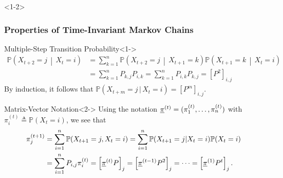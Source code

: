 \documentclass[10pt,english,aspectratio=169]{beamer}
\renewcommand{\Pr}{\mathbb{P}}
\begin{document}
\begin{frame}<1-2> \frametitle{Properties of Time-Invariant Markov Chains}

\vspace{-1.5mm}

\begin{exampleblock}{Multiple-Step Transition Probability}<1->
\vspace{-4mm}
\begin{align*}
\Pr\left(X_{t+2}=j\,\middle|\,X_{t}=i\right) & =\sum_{k=1}^{n}\Pr\left(X_{t+2}=j\,\middle|\,X_{t+1}=k\right)\Pr\left(X_{t+1}=k\,\middle|\,X_{t}=i\right)\\
 & =\sum_{k=1}^{n}P_{k,j}P_{i,k}=\sum_{k=1}^{n}P_{i,k}P_{k,j}=\left[P^{2}\right]_{i,j}
\end{align*}
By induction, it follows that $\Pr(X_{t+m}=j\,|\,X_{t}=i)=\left[P^{m}\right]_{i,j}$.
\end{exampleblock}
\vspace{-0.5mm}
\begin{exampleblock}{Matrix-Vector Notation}<2->
Using the notation $\underline{\pi}^{(t)}=(\pi_{1}^{(t)},\ldots,\pi_{n}^{(t)})$ with $\pi_{i}^{(t)}\triangleq\Pr(X_{t}=i)$, we see that \vspace{-2.5mm}
\begin{align*}
\pi_{j}^{(t+1)} & =\sum_{i=1}^{n}\Pr(X_{t+1}=j,X_{t}=i) 
=\sum_{i=1}^{n}\Pr(X_{t+1}=j|X_{t}=i)\Pr(X_{t}=i)\\
 & =\sum_{i=1}^{n}P_{i,j}\pi_{i}^{(t)}=\left[\vecnot{\pi}^{(t)}P\right]_{j}=\left[\vecnot{\pi}^{(t-1)}P^2\right]_{j}= \cdots = \left[\vecnot{\pi}^{(1)}P^t\right]_{j}.%
 \vspace*{-0.5mm}
\end{align*}
\end{exampleblock}


\end{frame}
\end{document}

